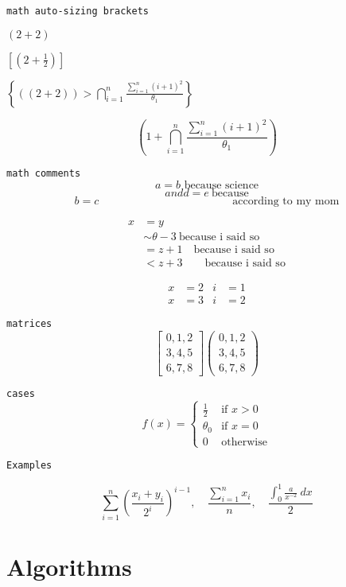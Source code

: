 \documentclass[11pt, oneside]{article}   	%
\newcommand{\bp}[1]{\left( #1 \right)}
\newcommand{\bb}[1]{\left[ #1 \right]}
\newcommand{\bc}[1]{\left\{ #1 \right \}}
\begin{document}
\texttt{math auto-sizing brackets}

$\bp{2+2}$

$\bb{\bp{2+\frac{1}{2}}}$

$\bc{\bp{\bp{2 + 2}} > \bigcap_{i=1}^n \frac{\sum_{i=1}^n \bp{i +1}^2}{\theta_1}}$

$$\bp{1 + \bigcap_{i=1}^n \frac{\sum_{i=1}^n \bp{i +1}^2}{\theta_1}}$$

\newpage

\texttt{math comments}
$$ a = b \text{ because science}$$
$$ and d = e \ \text{because}$$
$$ b = c \hspace{2in} \text{according to my mom}$$

\begin{align*}
x &= y \\
&\sim \theta - 3 \ \text{because i said so} \\
&= z + 1 \quad \text{because i said so} \\
&< z + 3 \qquad \text{because i said so}
\end{align*}

\begin{align*}
x &= 2 & i &= 1 \\
x &= 3 & i &= 2
\end{align*}

\texttt{matrices}
$$ 
\begin{bmatrix} 0,1,2 \\ 3,4,5 \\ 6,7,8 \end{bmatrix} \begin{pmatrix} 0,1,2 \\ 3,4,5 \\ 6,7,8 \end{pmatrix} 
$$

\texttt{cases}
$$f(x) = \begin{cases}
\frac{1}{2} &\text{if } x > 0 \\
\theta_0    &\text{if } x = 0 \\
0 &\text{otherwise}
\end{cases}
$$

\begin{center}
\texttt{Examples}
\end{center}
$$
\sum_{i=1}^n \bp{\frac{x_i+y_i}{2^i}}^{i-1}, \quad
\frac{\sum_{i=1}^n x_i}{n}, \quad
\frac{\int_0^1 \frac{a}{x^{-2}} \ dx}{2}
$$




\newpage

\section{Algorithms} \noindent
\end{document}
